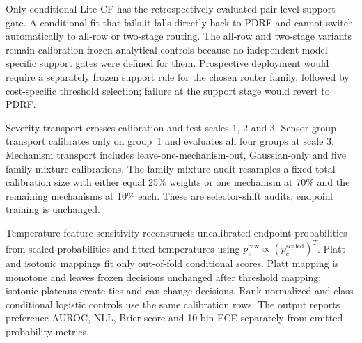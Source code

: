 \documentclass[10pt]{article}
\begin{document}
Only conditional Lite-CF has the retrospectively evaluated pair-level support gate. A conditional fit that fails it falls directly back to PDRF and cannot switch automatically to all-row or two-stage routing. The all-row and two-stage variants remain calibration-frozen analytical controls because no independent model-specific support gates were defined for them. Prospective deployment would require a separately frozen support rule for the chosen router family, followed by cost-specific threshold selection; failure at the support stage would revert to PDRF.

\begin{table}[H]
\centering
\caption{Complete fitted-pair dispersion and decision metrics for endpoint, safety and utility-selected policies. Each fitted-pair row first pools the four fixed mechanisms. Utilities are per 10,000 strict observations with $V_C=1$ and $\lambda=0$. Calibration utility and test-minus-calibration change are available only for the three utility-selected router families. Because decision-event denominators are pooled within fitted pair before averaging, decision percentages can differ slightly from the equal-weight mechanism--pair headline means.}
\label{tab:supp-utility-dispersion}
\scriptsize
\resizebox{\textwidth}{!}{}
\end{table}

Severity transport crosses calibration and test scales 1, 2 and 3. Sensor-group transport calibrates only on group~1 and evaluates all four groups at scale 3. Mechanism transport includes leave-one-mechanism-out, Gaussian-only and five family-mixture calibrations. The family-mixture audit resamples a fixed total calibration size with either equal 25\% weights or one mechanism at 70\% and the remaining mechanisms at 10\% each. These are selector-shift audits; endpoint training is unchanged.

Temperature-feature sensitivity reconstructs uncalibrated endpoint probabilities from scaled probabilities and fitted temperatures using $p_c^{\mathrm{raw}}\propto(p_c^{\mathrm{scaled}})^T$. Platt and isotonic mappings fit only out-of-fold conditional scores. Platt mapping is monotone and leaves frozen decisions unchanged after threshold mapping; isotonic plateaus create ties and can change decisions. Rank-normalized and class-conditional logistic controls use the same calibration rows. The output reports preference AUROC, NLL, Brier score and 10-bin ECE separately from emitted-probability metrics.
\end{document}
